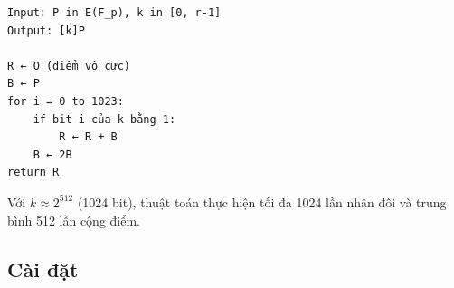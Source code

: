 \begin{verbatim}
Input: P in E(F_p), k in [0, r-1]
Output: [k]P

R ← O (điểm vô cực)
B ← P
for i = 0 to 1023:
    if bit i của k bằng 1:
        R ← R + B
    B ← 2B
return R
\end{verbatim}

Với \(k \approx 2^{512}\) (1024 bit), thuật toán thực hiện tối đa 1024
lần nhân đôi và trung bình 512 lần cộng điểm.

\subsection{Cài đặt}\label{cuxe0i-ux111ux1eb7t-1}

\begin{Shaded}
\begin{Highlighting}[]
 \OperatorTok{\&}\OperatorTok{,}\OperatorTok{:} \OperatorTok{\&}\OperatorTok{{-}\textgreater{}}  \OperatorTok{\{}
     \OperatorTok{=} \PreprocessorTok{::}\OperatorTok{;}
     \OperatorTok{=} \OperatorTok{*}\OperatorTok{;}
      \OperatorTok{\{}
        \OperatorTok{=}\OperatorTok{/} \OperatorTok{;}
        \OperatorTok{=}\OperatorTok{\%} \OperatorTok{;}
        \OperatorTok{\textgreater{}\textgreater{}}\OperatorTok{\&}  \OperatorTok{==}  \OperatorTok{\{}
\OperatorTok{=}\OperatorTok{\&}\OperatorTok{;}
        \OperatorTok{\}}
\OperatorTok{=}\OperatorTok{;}
    \OperatorTok{\}}
\OperatorTok{\}}
\end{Highlighting}
\end{Shaded}

\label{lst:ch2_mul}\vspace{12pt}

